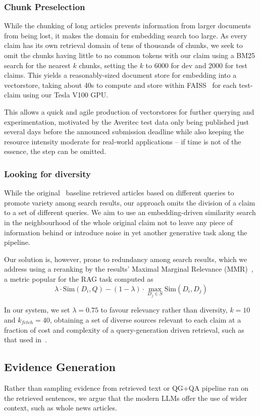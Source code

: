 \subsubsection{Chunk Preselection}
While the chunking of long articles prevents information from larger documents from being lost, it makes the domain for embedding search too large.
As every claim has its own retrieval domain of tens of thousands of chunks, we seek to omit the chunks having little to no common tokens with our claim using a BM25 search for the nearest $k$ chunks, setting the $k$ to 6000 for dev and 2000 for test claims. 
This yields a reasonably-sized document store for embedding into a vectorstore, taking about 40s to compute and store within FAISS~\cite{douze2024faiss} for each test-claim using our Tesla V100 GPU.

This allows a quick and agile production of vectorstores for further querying and experimentation, motivated by the Averitec test data only being published just several days before the announced submission deadline while also keeping the resource intensity moderate for real-world applications -- if time is not of the essence, the step can be omitted.

\subsubsection{Looking for diversity}
While the original~\cite{averitec2024} baseline retrieved articles based on different queries to promote variety among search results, our approach omits the division of a claim to a set of different queries.
We aim to use an embedding-driven similarity search in the neighbourhood of the whole original claim not to leave any piece of information behind or introduce noise in yet another generative task along the pipeline.

Our solution is, however, prone to redundancy among search results, which we address using a reranking by the results' Maximal Marginal Relevance (MMR)~\cite{carbonell-mmr}, a metric popular for the RAG task computed as
$$\lambda \cdot \mathrm{Sim}(D_i, Q) - (1-\lambda) \cdot \max_{D_j \in S} \mathrm{Sim}(D_i, D_j)$$

In our system, we set $\lambda=0.75$ to favour relevancy rather than diversity, $k=10$ and $k_{fetch} = 40$, obtaining a set of diverse sources relevant to each claim at a fraction of cost and complexity of a query-generation driven retrieval, such as that used in~\cite{averitec2024}.

\subsection{Evidence Generation}
Rather than sampling evidence from retrieved text or QG+QA pipeline ran on the retrieved sentences, we argue that the modern LLMs offer the use of wider context, such as whole news articles.


